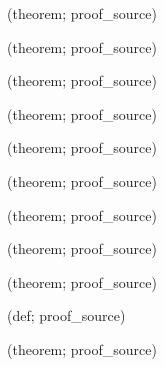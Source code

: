 \noindent{} {\scriptsize (theorem; proof\_source)}\par
\noindent{} {\scriptsize (theorem; proof\_source)}\par
\noindent{} {\scriptsize (theorem; proof\_source)}\par
\noindent{} {\scriptsize (theorem; proof\_source)}\par
\noindent{} {\scriptsize (theorem; proof\_source)}\par
\noindent{} {\scriptsize (theorem; proof\_source)}\par
\noindent{} {\scriptsize (theorem; proof\_source)}\par
\noindent{} {\scriptsize (theorem; proof\_source)}\par
\noindent{} {\scriptsize (theorem; proof\_source)}\par
\noindent{} {\scriptsize (def; proof\_source)}\par
\noindent{} {\scriptsize (theorem; proof\_source)}\par
\endgroup
